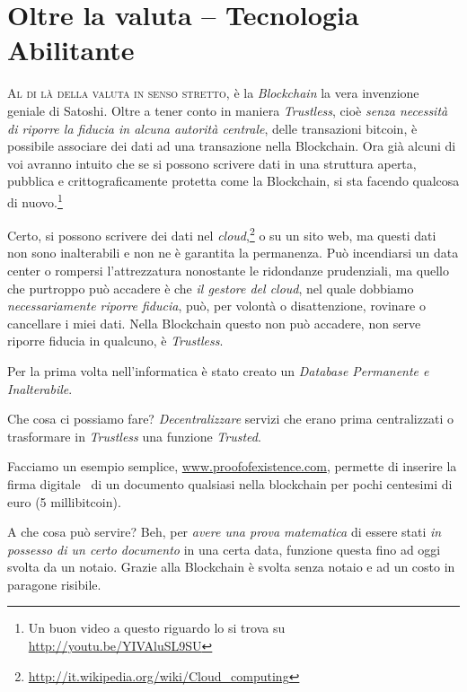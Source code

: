 \documentclass[a4paper,12pt,italian]{article}
\begin{document}
\section*{Oltre la valuta -- Tecnologia Abilitante}


\lettrine{A}{l di là della valuta in senso stretto}, è la \emph{Blockchain} la vera invenzione 
geniale di Satoshi.
Oltre a tener conto in maniera \emph{Trustless}, cioè \emph{senza
necessità di riporre la fiducia in alcuna autorità centrale}, delle
transazioni bitcoin, è possibile associare dei dati ad una
transazione nella Blockchain. Ora già alcuni di voi avranno intuito che
se si possono scrivere dati in una struttura aperta, pubblica e
crittograficamente protetta come la Blockchain, si sta facendo qualcosa
di nuovo.\footnote{Un buon video a questo riguardo lo si trova su
\url{http://youtu.be/YIVAluSL9SU}}


\bigskip

Certo, si possono scrivere dei dati nel \emph{cloud},\footnote{\url{http://it.wikipedia.org/wiki/Cloud_computing}} o su un sito web, ma
questi dati non sono inalterabili e non ne è garantita la permanenza. Può incendiarsi un data center
o rompersi l'attrezzatura nonostante le ridondanze prudenziali, ma quello che purtroppo può accadere
è che \emph{il gestore del cloud}, nel quale dobbiamo \emph{necessariamente riporre fiducia}, può, per volontà o disattenzione, rovinare o cancellare i miei
dati. Nella Blockchain questo non può accadere, non serve riporre fiducia in qualcuno, è \emph{Trustless}.

\bigskip

Per la prima volta nell’informatica è stato creato un \emph{Database
Permanente e Inalterabile}.


\bigskip

Che cosa ci possiamo fare? \emph{Decentralizzare} servizi che erano prima
centralizzati o trasformare in \emph{Trustless} una funzione \emph{Trusted}.


\bigskip

Facciamo un esempio semplice, \url{www.proofofexistence.com}, permette di
inserire la firma digitale \ di un documento qualsiasi nella blockchain
per pochi centesimi di euro (5 millibitcoin).


A che cosa può servire? Beh, per \emph{avere una prova matematica} di essere
stati \emph{in possesso di un certo documento} in una certa data, funzione
questa fino ad oggi svolta da un notaio. Grazie alla Blockchain è
svolta senza notaio e ad un costo in paragone risibile.
\end{document}
